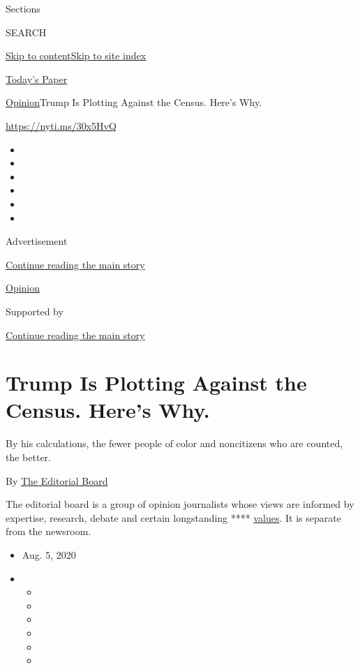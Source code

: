 Sections

SEARCH

\protect\hyperlink{site-content}{Skip to
content}\protect\hyperlink{site-index}{Skip to site index}

\href{https://myaccount.nytimes.com/auth/login?response_type=cookie\&client_id=vi}{}

\href{https://www.nytimes.com/section/todayspaper}{Today's Paper}

\href{/section/opinion}{Opinion}\textbar{}Trump Is Plotting Against the
Census. Here's Why.

\href{https://nyti.ms/30x5HvQ}{https://nyti.ms/30x5HvQ}

\begin{itemize}
\item
\item
\item
\item
\item
\item
\end{itemize}

Advertisement

\protect\hyperlink{after-top}{Continue reading the main story}

\href{/section/opinion}{Opinion}

Supported by

\protect\hyperlink{after-sponsor}{Continue reading the main story}

\hypertarget{trump-is-plotting-against-the-census-heres-why}{%
\section{Trump Is Plotting Against the Census. Here's
Why.}\label{trump-is-plotting-against-the-census-heres-why}}

By his calculations, the fewer people of color and noncitizens who are
counted, the better.

By
\href{https://www.nytimes.com/interactive/opinion/editorialboard.html}{The
Editorial Board}

The editorial board is a group of opinion journalists whose views are
informed by expertise, research, debate and certain longstanding ****
\href{https://www.nytimes.com/interactive/2018/opinion/editorialboard.html}{values}.
It is separate from the newsroom.

\begin{itemize}
\item
  Aug. 5, 2020
\item
  \begin{itemize}
  \item
  \item
  \item
  \item
  \item
  \item
  \end{itemize}
\end{itemize}

